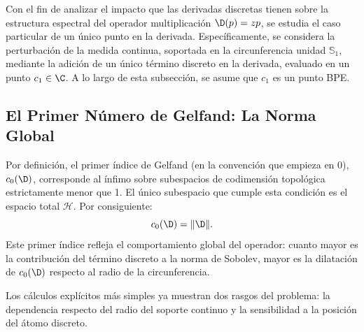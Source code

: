 Con el fin de analizar el impacto que las derivadas discretas tienen sobre la estructura espectral del operador multiplicación $\D(p) = zp$, se estudia el caso particular de un único punto en la derivada. Específicamente, se considera la perturbación de la medida continua, soportada en la circunferencia unidad $\mathbb{S}_1$, mediante la adición de un único término discreto en la derivada, evaluado en un punto $c_1 \in \C$. A lo largo de esta subsección, se asume que $c_1$ es un punto BPE.

\subsection{El Primer Número de Gelfand: La Norma Global}

Por definición, el primer índice de Gelfand (en la convención que empieza en $0$), $c_0(\D)$, corresponde al ínfimo sobre subespacios de codimensión topológica estrictamente menor que 1. El único subespacio que cumple esta condición es el espacio total $\mathcal{H}$. Por consiguiente:
$$ c_0(\D) = \|\D\|. $$
Este primer índice refleja el comportamiento global del operador: cuanto mayor es la contribución del término discreto a la norma de Sobolev, mayor es la dilatación de $c_0(\D)$ respecto al radio de la circunferencia.

Los cálculos explícitos más simples ya muestran dos rasgos del problema: la dependencia respecto del radio del soporte continuo y la sensibilidad a la posición del átomo discreto.

